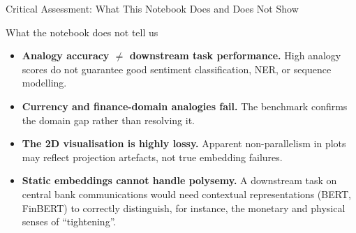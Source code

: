 \documentclass[11pt,aspectratio=169,professionalfonts]{beamer}
\begin{document}
%
%
\begin{frame}{Critical Assessment: What This Notebook Does and Does Not Show}
\begin{alertblock}{What the notebook does not tell us}
  \begin{itemize}
    \item \textbf{Analogy accuracy $\neq$ downstream task performance.}
          High analogy scores do not guarantee good sentiment
          classification, NER, or sequence modelling.
    \item \textbf{Currency and finance-domain analogies fail.}
          The benchmark confirms the domain gap rather than resolving it.
    \item \textbf{The 2D visualisation is highly lossy.}
          Apparent non-parallelism in plots may reflect projection
          artefacts, not true embedding failures.
    \item \textbf{Static embeddings cannot handle polysemy.}
          A downstream task on central bank communications would
          need contextual representations (BERT, FinBERT) to correctly
          distinguish, for instance, the monetary and physical senses
          of ``tightening''.
  \end{itemize}
\end{alertblock}

\end{frame}
%
%
\end{document}
